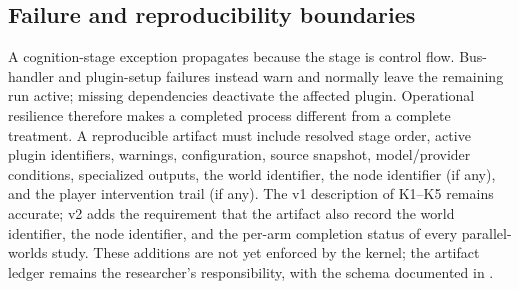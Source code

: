 \subsection{Failure and reproducibility boundaries}

A cognition-stage exception propagates because the stage is control flow.
Bus-handler and plugin-setup failures instead warn and normally leave the
remaining run active; missing dependencies deactivate the affected plugin.
Operational resilience therefore makes a completed process different from a
complete treatment.  A reproducible artifact must include resolved stage
order, active plugin identifiers, warnings, configuration, source snapshot,
model/provider conditions, specialized outputs, the world identifier, the
node identifier (if any), and the player intervention trail (if any).  The
v1 description of K1--K5 remains accurate; v2 adds the requirement that the
artifact also record the world identifier, the node identifier, and the
per-arm completion status of every parallel-worlds study.  These additions
are not yet enforced by the kernel; the artifact ledger remains the
researcher's responsibility, with the schema documented in
.
